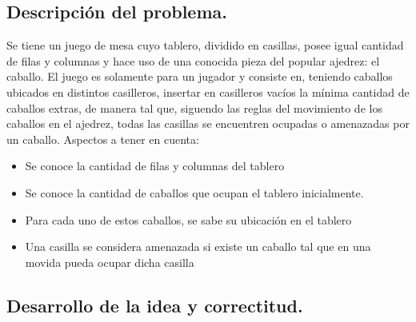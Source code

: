 \subsection{Descripción del problema.}

\vspace*{0.3cm}

Se tiene un juego de mesa cuyo tablero, dividido en casillas, posee igual cantidad de filas y columnas y hace uso de una conocida pieza del popular ajedrez: el caballo. El juego es solamente para un jugador y consiste en, teniendo caballos ubicados en distintos casilleros, insertar en casilleros vacíos la mínima cantidad de caballos extras, de manera tal que, siguendo las reglas del movimiento de los caballos en el ajedrez, todas las casillas se encuentren ocupadas o amenazadas por un caballo.
Aspectos a tener en cuenta:

\begin{itemize}
   \item Se conoce la cantidad de filas y columnas del tablero
   \item Se conoce la cantidad de caballos que ocupan el tablero inicialmente.
   \item Para cada uno de estos caballos, se sabe su ubicación en el tablero
   \item Una casilla se considera amenazada si existe un caballo tal que en una movida pueda ocupar dicha casilla
\end{itemize}


\vspace*{0.6cm}

\subsection{Desarrollo de la idea y correctitud.}


